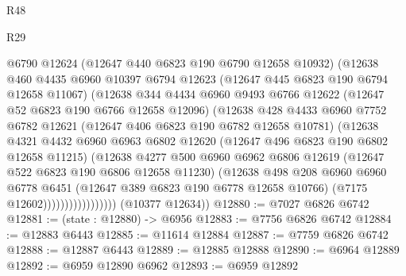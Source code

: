 \begin{lexlean}{R48}
\begin{lexlean}{R29}
\begin{coremodule}
{{{{{{{{{{{{{{{{{{{{{{{{{{{{{{{{{{{{{{{{{{{{{{{{{{{{{{{{{{{{{{{{{{{{{{{{{{{{{{{{{{{{{{{{{{{{{{{{{{{{{{{{{{{{{{{{{{{{{{{{{{{{{{{{{{{{{{{{{{{{{{{{{{{{{{{{{{{{{{{{{{{{{{{{{{{{{{{{{{{{{{{{{{{{{{{{{{{{{{{{{{{{{{{{{{{{{{{{{{                          @6790
                          @12624
                          (@12647 @440 @6823 @190 @6790 @12658 @10932)
                          (@12638
                            @460
                            @4435
                            @6960
                            @10397
                            @6794
                            @12623
                            (@12647 @445 @6823 @190 @6794 @12658 @11067)
                            (@12638
                              @344
                              @4434
                              @6960
                              @9493
                              @6766
                              @12622
                              (@12647 @52 @6823 @190 @6766 @12658 @12096)
                              (@12638
                                @428
                                @4433
                                @6960
                                @7752
                                @6782
                                @12621
                                (@12647 @406 @6823 @190 @6782 @12658 @10781)
                                (@12638
                                  @4321
                                  @4432
                                  @6960
                                  @6963
                                  @6802
                                  @12620
                                  (@12647 @496 @6823 @190 @6802 @12658 @11215)
                                  (@12638
                                    @4277
                                    @500
                                    @6960
                                    @6962
                                    @6806
                                    @12619
                                    (@12647 @522 @6823 @190 @6806 @12658 @11230)
                                    (@12638
                                      @498
                                      @208
                                      @6960
                                      @6960
                                      @6778
                                      @6451
                                      (@12647 @389 @6823 @190 @6778 @12658 @10766)
                                      (@7175 @12602)))))))))))))))))
      (@10377 @12634))
@12880 := @7027 @6826 @6742
@12881 := (state : @12880) -> @6956
@12883 := @7756 @6826 @6742
@12884 := @12883 @6443
@12885 := @11614 @12884
@12887 := @7759 @6826 @6742
@12888 := @12887 @6443
@12889 := @12885 @12888
@12890 := @6964 @12889
@12892 := @6959 @12890 @6962
@12893 := @6959 @12892
}}}}}}}}}}}}}}}}}}}}}}}}}}}}}}}}}}}}}}}}}}}}}}}}}}}}}}}}}}}}}}}}}}}}}}}}}}}}}}}}}}}}}}}}}}}}}}}}}}}}}}}}}}}}}}}}}}}}}}}}}}}}}}}}}}}}}}}}}}}}}}}}}}}}}}}}}}}}}}}}}}}}}}}}}}}}}}}}}}}}}}}}}}}}}}}}}}}}}}}}}}}}}}}}}}}}}}}}}}
\end{coremodule}
\end{lexlean}
\end{lexlean}
